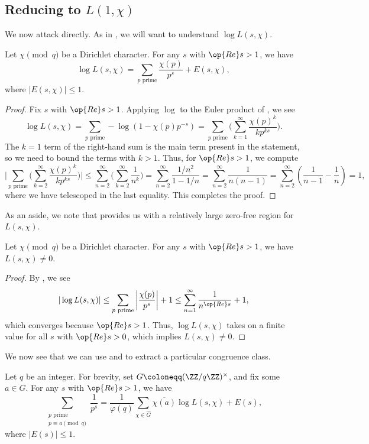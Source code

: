 \documentclass[../notes.tex]{subfiles}
\begin{document}
\subsection{Reducing to \texorpdfstring{$L(1,\chi)$}{ L(1,chi)}}
We now attack  directly. As in , we will want to understand $\log L(s,\chi)$.
\begin{lemma} \label{lem:log-l-s-chi}
	Let $\chi\pmod q$ be a Dirichlet character. For any $s$ with $\op{Re}s>1$, we have
	\[\log L(s,\chi)=\sum_{p\text{ prime}}\frac{\chi(p)}{p^s}+E(s,\chi),\]
	where $|E(s,\chi)|\le1$.
\end{lemma}
\begin{proof}
	Fix $s$ with $\op{Re}s>1$. Applying $\log$ to the Euler product of , we see
	\[\log L(s,\chi)=\sum_{p\text{ prime}}-\log\left(1-\chi(p)p^{-s}\right)=\sum_{p\text{ prime}}\Bigg(\sum_{k=1}^\infty\frac{\chi(p)^k}{kp^{ks}}\Bigg).\]
	The $k=1$ term of the right-hand sum is the main term present in the statement, so we need to bound the terms with $k>1$. Thus, for $\op{Re}s>1$, we compute
	\[\Bigg|\sum_{p\text{ prime}}\Bigg(\sum_{k=2}^\infty\frac{\chi(p)^k}{kp^{ks}}\Bigg)\Bigg|\le\sum_{n=2}^\infty\Bigg(\sum_{k=2}^\infty\frac1{n^k}\Bigg)=\sum_{n=2}^\infty\frac{1/n^2}{1-1/n}=\sum_{n=2}^\infty\frac1{n(n-1)}=\sum_{n=2}^\infty\left(\frac1{n-1}-\frac1n\right)=1,\]
	where we have telescoped in the last equality. This completes the proof.
\end{proof}
As an aside, we note that  provides us with a relatively large zero-free region for $L(s,\chi)$.
\begin{corollary} \label{cor:dumb-zero-free}
	Let $\chi\pmod q$ be a Dirichlet character. For any $s$ with $\op{Re}s>1$, we have $L(s,\chi)\ne0$.
\end{corollary}
\begin{proof}
	By , we see
	\[|\log L(s,\chi)|\le\sum_{p\text{ prime}}\left|\frac{\chi(p)}{p^s}\right|+1\le\sum_{n=1}^\infty\frac1{n^{\op{Re}s}}+1,\]
	which converges because $\op{Re}s>1$. Thus, $\log L(s,\chi)$ takes on a finite value for all $s$ with $\op{Re}s>0$, which implies $L(s,\chi)\ne0$.
\end{proof}
We now see that we can use  and  to extract a particular congruence class.
\begin{lemma} \label{lem:convert-to-l-1-chi}
	Let $q$ be an integer. For brevity, set $G\coloneqq(\ZZ/q\ZZ)^\times$, and fix some $a\in G$. For any $s$ with $\op{Re}s>1$, we have
	\[\sum_{\substack{p\text{ prime}\\p\equiv a\pmod q}}\frac1{p^s}=\frac1{\varphi(q)}\sum_{\chi\in\widehat G}\overline{\chi(a)}\log L(s,\chi)+E(s),\]
	where $|E(s)|\le1$.
\end{lemma}
\end{document}
